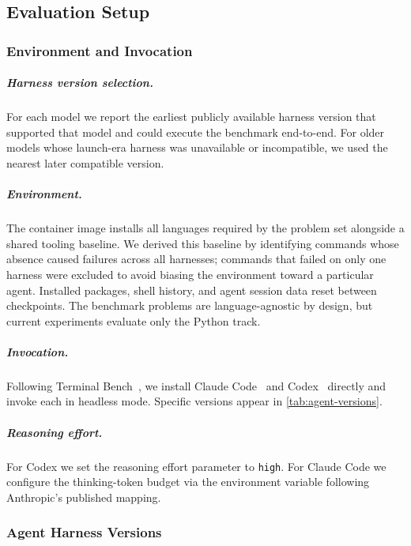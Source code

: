 \subsection{Evaluation Setup}\label{sec:eval-env-details}

\subsubsection{Environment and Invocation}

\subparagraph{Harness version selection.} For each model we report the earliest publicly available harness version that supported that model and could execute the benchmark end-to-end. For older models whose launch-era harness was unavailable or incompatible, we used the nearest later compatible version.

\subparagraph{Environment.} The container image installs all languages required by the problem set alongside a shared tooling baseline. We derived this baseline by identifying commands whose absence caused failures across all harnesses; commands that failed on only one harness were excluded to avoid biasing the environment toward a particular agent. Installed packages, shell history, and agent session data reset between checkpoints. The benchmark problems are language-agnostic by design, but current experiments evaluate only the Python track.

\subparagraph{Invocation.} Following Terminal Bench~\citep{tb2}, we install Claude Code~\citep{claude_code} and Codex~\citep{codex} directly and invoke each in headless mode. Specific versions appear in \autoref{tab:agent-versions}.

\subparagraph{Reasoning effort.} For Codex we set the reasoning effort parameter to \texttt{high}. For Claude Code we configure the thinking-token budget via the environment variable following Anthropic's published mapping.

\subsubsection{Agent Harness Versions}\label{sec:agent-versions}

